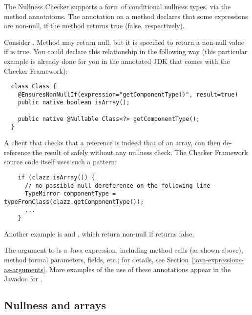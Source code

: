 The Nullness Checker supports a form of conditional nullness types, via the
 method annotations.
The annotation on a method declares that some expressions are non-null, if
the method returns true (false, respectively).

Consider .
Method
may return null, but it is specified to return a non-null value if
 is
true.
You could declare this relationship in the following way (this particular
example is already
done for you in the annotated JDK that comes with the Checker Framework):

\begin{Verbatim}
  class Class {
    @EnsuresNonNullIf(expression="getComponentType()", result=true)
    public native boolean isArray();

    public native @Nullable Class<?> getComponentType();
  }
\end{Verbatim}

A client that checks that a  reference is indeed that of an array,
can then de-reference the result of  safely
without any nullness check.  The Checker Framework source code itself
uses such a pattern:

\begin{Verbatim}
    if (clazz.isArray()) {
      // no possible null dereference on the following line
      TypeMirror componentType = typeFromClass(clazz.getComponentType());
      ...
    }
\end{Verbatim}

Another example is 
and , which return
non-null if 
returns false.

The argument to  is a Java expression, including method calls
(as shown above), method formal parameters, fields, etc.; for details, see
Section~\ref{java-expressions-as-arguments}.
More examples of the use of these annotations appear in the Javadoc for
.


\subsection{Nullness and arrays\label{nullness-arrays}}

